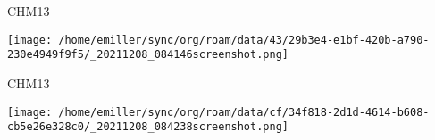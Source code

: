 \documentclass[bigger]{beamer}
\begin{document}
\begin{frame}[label={sec:orge17da0c}]{CHM13}
\begin{center}
\texttt{[image: /home/emiller/sync/org/roam/data/43/29b3e4-e1bf-420b-a790-230e4949f9f5/\_20211208\_084146screenshot.png]}
\end{center}
\end{frame}

\begin{frame}[label={sec:orgd5d287e}]{CHM13}
\begin{center}
\texttt{[image: /home/emiller/sync/org/roam/data/cf/34f818-2d1d-4614-b608-cb5e26e328c0/\_20211208\_084238screenshot.png]}
\end{center}
\end{frame}
\end{document}
